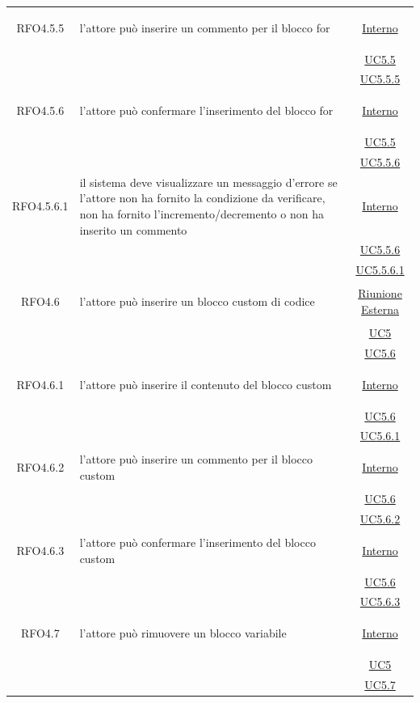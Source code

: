 \begin{longtable}{|c|>{\centering}m{7cm}|c|}
\hypertarget{RFO4.5.5}{RFO4.5.5} & l'attore può inserire un commento per il blocco for & \hyperlink{Interno}{Interno}\\
& &\hyperref[UC5.5]{UC5.5}\\
& &\hyperref[UC5.5.5]{UC5.5.5}\\ \hline

\hypertarget{RFO4.5.6}{RFO4.5.6} & l'attore può confermare l'inserimento del blocco for &  \hyperlink{Interno}{Interno}\\
& &\hyperref[UC5.5]{UC5.5}\\
& &\hyperref[UC5.5.6]{UC5.5.6}\\ \hline

\hypertarget{RFO4.5.6.1}{RFO4.5.6.1} & il sistema deve visualizzare un messaggio d'errore se l'attore non ha fornito la condizione da verificare, non ha fornito l'incremento/decremento o non ha inserito un commento & \hyperlink{Interno}{Interno}\\
& &\hyperref[UC5.5.6]{UC5.5.6}\\
& &\hyperref[UC5.5.6.1]{UC5.5.6.1}\\ \hline

\hypertarget{RFO4.6}{RFO4.6} & l'attore può inserire un blocco custom di codice & \hyperlink{Riunione Esterna}{Riunione Esterna}\\
& &\hyperref[UC5]{UC5}\\
& &\hyperref[UC5.6]{UC5.6}\\ \hline

\hypertarget{RFO4.6.1}{RFO4.6.1} & l'attore può inserire il contenuto del blocco custom & \hyperlink{Interno}{Interno}\\
& &\hyperref[UC5.6]{UC5.6}\\
& &\hyperref[UC5.6.1]{UC5.6.1}\\ \hline

\hypertarget{RFO4.6.2}{RFO4.6.2} & l'attore può inserire un commento per il blocco custom & \hyperlink{Interno}{Interno}\\
& &\hyperref[UC5.6]{UC5.6}\\
& &\hyperref[UC5.6.2]{UC5.6.2}\\ \hline

\hypertarget{RFO4.6.3}{RFO4.6.3} & l'attore può confermare l'inserimento del blocco custom &\hyperlink{Interno}{Interno}\\
& &\hyperref[UC5.6]{UC5.6}\\
& &\hyperref[UC5.6.3]{UC5.6.3}\\ \hline

\hypertarget{RFO4.7}{RFO4.7} & l'attore può rimuovere un blocco variabile &\hyperlink{Interno}{Interno}\\
& &\hyperref[UC5]{UC5}\\
& &\hyperref[UC5.7]{UC5.7}\\ \hline


\end{longtable}
